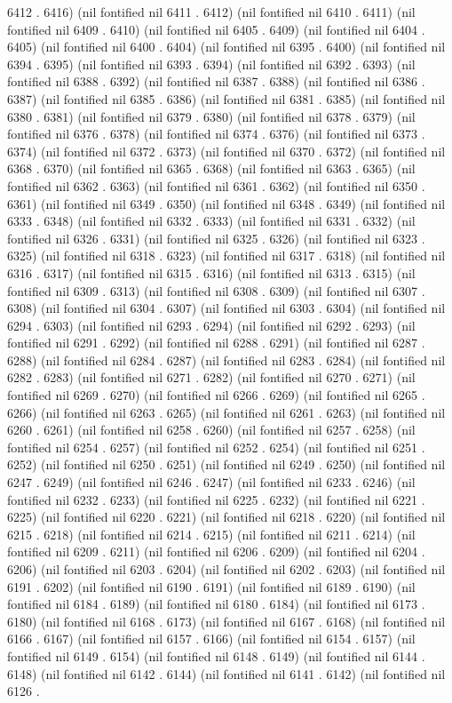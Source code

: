 {6412 . 6416) (nil fontified nil 6411 . 6412) (nil fontified nil 6410 . 6411) (nil fontified nil 6409 . 6410) (nil fontified nil 6405 . 6409) (nil fontified nil 6404 . 6405) (nil fontified nil 6400 . 6404) (nil fontified nil 6395 . 6400) (nil fontified nil 6394 . 6395) (nil fontified nil 6393 . 6394) (nil fontified nil 6392 . 6393) (nil fontified nil 6388 . 6392) (nil fontified nil 6387 . 6388) (nil fontified nil 6386 . 6387) (nil fontified nil 6385 . 6386) (nil fontified nil 6381 . 6385) (nil fontified nil 6380 . 6381) (nil fontified nil 6379 . 6380) (nil fontified nil 6378 . 6379) (nil fontified nil 6376 . 6378) (nil fontified nil 6374 . 6376) (nil fontified nil 6373 . 6374) (nil fontified nil 6372 . 6373) (nil fontified nil 6370 . 6372) (nil fontified nil 6368 . 6370) (nil fontified nil 6365 . 6368) (nil fontified nil 6363 . 6365) (nil fontified nil 6362 . 6363) (nil fontified nil 6361 . 6362) (nil fontified nil 6350 . 6361) (nil fontified nil 6349 . 6350) (nil fontified nil 6348 . 6349) (nil fontified nil 6333 . 6348) (nil fontified nil 6332 . 6333) (nil fontified nil 6331 . 6332) (nil fontified nil 6326 . 6331) (nil fontified nil 6325 . 6326) (nil fontified nil 6323 . 6325) (nil fontified nil 6318 . 6323) (nil fontified nil 6317 . 6318) (nil fontified nil 6316 . 6317) (nil fontified nil 6315 . 6316) (nil fontified nil 6313 . 6315) (nil fontified nil 6309 . 6313) (nil fontified nil 6308 . 6309) (nil fontified nil 6307 . 6308) (nil fontified nil 6304 . 6307) (nil fontified nil 6303 . 6304) (nil fontified nil 6294 . 6303) (nil fontified nil 6293 . 6294) (nil fontified nil 6292 . 6293) (nil fontified nil 6291 . 6292) (nil fontified nil 6288 . 6291) (nil fontified nil 6287 . 6288) (nil fontified nil 6284 . 6287) (nil fontified nil 6283 . 6284) (nil fontified nil 6282 . 6283) (nil fontified nil 6271 . 6282) (nil fontified nil 6270 . 6271) (nil fontified nil 6269 . 6270) (nil fontified nil 6266 . 6269) (nil fontified nil 6265 . 6266) (nil fontified nil 6263 . 6265) (nil fontified nil 6261 . 6263) (nil fontified nil 6260 . 6261) (nil fontified nil 6258 . 6260) (nil fontified nil 6257 . 6258) (nil fontified nil 6254 . 6257) (nil fontified nil 6252 . 6254) (nil fontified nil 6251 . 6252) (nil fontified nil 6250 . 6251) (nil fontified nil 6249 . 6250) (nil fontified nil 6247 . 6249) (nil fontified nil 6246 . 6247) (nil fontified nil 6233 . 6246) (nil fontified nil 6232 . 6233) (nil fontified nil 6225 . 6232) (nil fontified nil 6221 . 6225) (nil fontified nil 6220 . 6221) (nil fontified nil 6218 . 6220) (nil fontified nil 6215 . 6218) (nil fontified nil 6214 . 6215) (nil fontified nil 6211 . 6214) (nil fontified nil 6209 . 6211) (nil fontified nil 6206 . 6209) (nil fontified nil 6204 . 6206) (nil fontified nil 6203 . 6204) (nil fontified nil 6202 . 6203) (nil fontified nil 6191 . 6202) (nil fontified nil 6190 . 6191) (nil fontified nil 6189 . 6190) (nil fontified nil 6184 . 6189) (nil fontified nil 6180 . 6184) (nil fontified nil 6173 . 6180) (nil fontified nil 6168 . 6173) (nil fontified nil 6167 . 6168) (nil fontified nil 6166 . 6167) (nil fontified nil 6157 . 6166) (nil fontified nil 6154 . 6157) (nil fontified nil 6149 . 6154) (nil fontified nil 6148 . 6149) (nil fontified nil 6144 . 6148) (nil fontified nil 6142 . 6144) (nil fontified nil 6141 . 6142) (nil fontified nil 6126 . }
